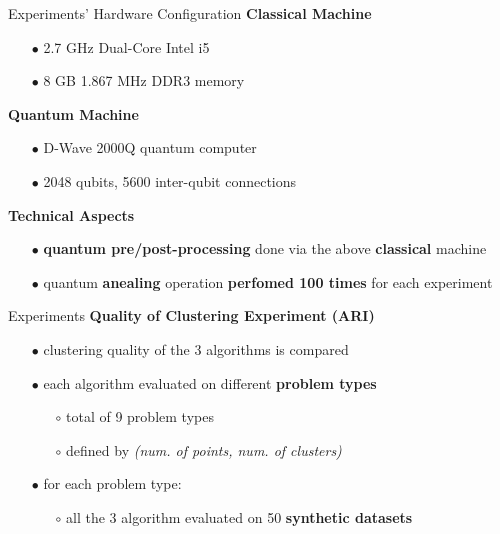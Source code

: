		\begin{frame}{Experiments' Hardware Configuration}	
			\textbf{Classical Machine}
			\begin{itemize}
				\item[$\bullet$] 2.7 GHz Dual-Core Intel i5 
				\item[$\bullet$] 8 GB 1.867 MHz DDR3 memory 
			\end{itemize}

			\textbf{Quantum Machine}
			\begin{itemize}
				\item[$\bullet$] D-Wave 2000Q quantum computer 
				\item[$\bullet$] 2048 qubits, 5600 inter-qubit connections
			\end{itemize}

			\textbf{Technical Aspects}
			\begin{itemize}
				\item[$\bullet$] \textbf{quantum pre/post-processing} done via the above \textbf{classical} machine
				\item[$\bullet$] quantum \textbf{anealing} operation \textbf{perfomed 100 times} for each experiment   
			\end{itemize}			


		\end{frame}

		\begin{frame}{Experiments}
			\textbf{Quality of Clustering Experiment (ARI)}
			\begin{itemize}
				\item[$\bullet$] clustering quality of the 3 algorithms is compared
				\item[$\bullet$] each algorithm evaluated on different \textbf{problem types}
				\begin{itemize}
					\item[$\circ$] total of 9 problem types 
					\item[$\circ$] defined by \textit{(num. of points, num. of clusters)}
				\end{itemize}
				\item[$\bullet$] for each problem type:
				\begin{itemize}
					\item[$\circ$]  all the 3 algorithm evaluated on 50 \textbf{synthetic datasets}
				\end{itemize}
			\end{itemize}

			
		\end{frame}

